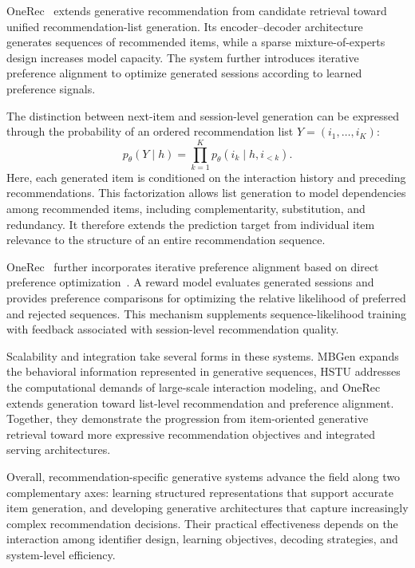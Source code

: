 \documentclass[sigconf,nonacm]{acmart}
\begin{document}
OneRec~\cite{onerec} extends generative
recommendation from candidate retrieval toward
unified recommendation-list generation. Its
encoder--decoder architecture generates sequences
of recommended items, while a sparse
mixture-of-experts design increases model capacity.
The system further introduces iterative preference
alignment to optimize generated sessions according
to learned preference signals.

The distinction between next-item and session-level
generation can be expressed through the probability
of an ordered recommendation list
$Y=(i_1,\ldots,i_K)$:
\begin{equation}
    p_\theta(Y\mid h)
    =
    \prod_{k=1}^{K}
    p_\theta(i_k\mid h,i_{<k}).
    \label{eq:session_generation}
\end{equation}
Here, each generated item is conditioned on the
interaction history and preceding recommendations.
This factorization allows list generation to model
dependencies among recommended items, including
complementarity, substitution, and redundancy.
It therefore extends the prediction target
from individual item relevance to the structure
of an entire recommendation sequence.

OneRec~\cite{onerec} further incorporates
iterative preference alignment based on direct
preference optimization~\cite{dpo}. A reward model
evaluates generated sessions and provides
preference comparisons for optimizing the
relative likelihood of preferred and rejected
sequences. This mechanism supplements
sequence-likelihood training with feedback
associated with session-level recommendation
quality.

Scalability and integration take several forms
in these systems. MBGen expands
the behavioral information represented in
generative sequences, HSTU addresses the
computational demands of large-scale interaction
modeling, and OneRec extends generation toward
list-level recommendation and preference alignment.
Together, they demonstrate the progression
from item-oriented generative retrieval toward
more expressive recommendation objectives
and integrated serving architectures.

Overall, recommendation-specific generative
systems advance the field along two complementary
axes: learning structured representations that
support accurate item generation, and developing
generative architectures that capture increasingly
complex recommendation decisions. Their practical
effectiveness depends on the interaction among
identifier design, learning objectives, decoding
strategies, and system-level efficiency.
\end{document}
